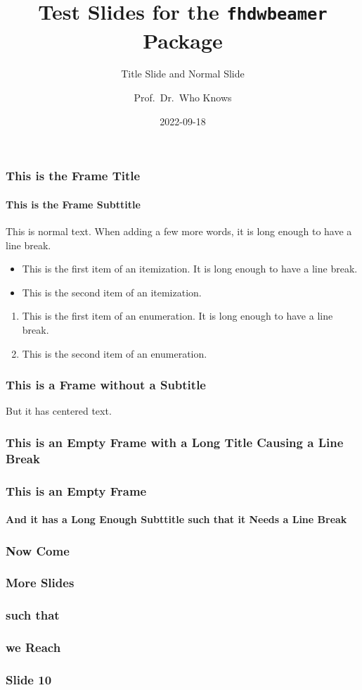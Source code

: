 \documentclass{beamer}
\title[Short Title]{Test Slides for the \texttt{fhdwbeamer} Package}
\subtitle{Title Slide and Normal Slide}
\author{Prof.\ Dr.\ Who Knows}
\date{2022-09-18}
\begin{document}
\maketitle

\begin{frame}
\frametitle{This is the Frame Title}
\framesubtitle{This is the Frame Subttitle}
This is normal text. When adding a few more words, it is long enough to have a line break.
\begin{itemize}
\item This is the first item of an itemization. It is long enough to have a line break.
\item This is the second item of an itemization.
\end{itemize}
\begin{enumerate}
\item This is the first item of an enumeration. It is long enough to have a line break.
\item This is the second item of an enumeration.
\end{enumerate}
\end{frame}

\begin{frame}
\frametitle{This is a Frame without a Subtitle}
\centering
But it has centered text.
\end{frame}

\begin{frame}
\frametitle{This is an Empty Frame with a Long Title Causing a Line Break}
\end{frame}

\begin{frame}
\frametitle{This is an Empty Frame}
\framesubtitle{And it has a Long Enough Subttitle such that it Needs a Line Break}
\end{frame}

\begin{frame}
\frametitle{Now Come}
\end{frame}

\begin{frame}
\frametitle{More Slides}
\end{frame}

\begin{frame}
\frametitle{such that}
\end{frame}

\begin{frame}
\frametitle{we Reach}
\end{frame}

\begin{frame}
\frametitle{Slide 10}
\end{frame}
\end{document}
